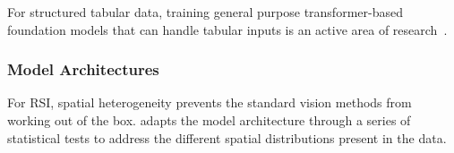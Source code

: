 

For structured tabular data, training general purpose transformer-based foundation models that can handle tabular inputs is an active area of research~\cite{Cong2023, Badaro2023}.

\cite{Iida2021, Somepalli2022, Seng2022, Yin2020, Herzig2020}

\subsubsection{Model Architectures}
For RSI, spatial heterogeneity prevents the standard vision methods from working out of the box. 
\cite{Xie2021} adapts the model architecture through a series of statistical tests to address the different spatial distributions present in the data.






        
        
        
